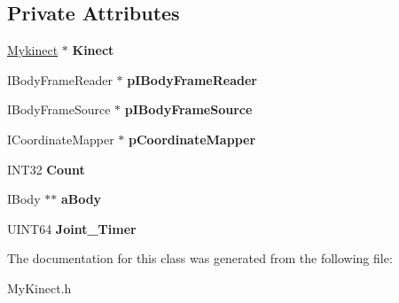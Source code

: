 \subsection*{Private Attributes}
\begin{DoxyCompactItemize}
\item 
\mbox{\label{class_kinect_1_1_my_joint_ac42457547f96340195948cba66a548e7}} 
\hyperlink{class_kinect_1_1_mykinect}{Mykinect} $\ast$ {\bfseries Kinect}
\item 
\mbox{\label{class_kinect_1_1_my_joint_a36372b93146bb4b64434cb0a545e642c}} 
I\+Body\+Frame\+Reader $\ast$ {\bfseries p\+I\+Body\+Frame\+Reader}
\item 
\mbox{\label{class_kinect_1_1_my_joint_a9759931d94f878f8b36f3aa62a4c1d2e}} 
I\+Body\+Frame\+Source $\ast$ {\bfseries p\+I\+Body\+Frame\+Source}
\item 
\mbox{\label{class_kinect_1_1_my_joint_a165f038eb7730194980c0ba420cc6279}} 
I\+Coordinate\+Mapper $\ast$ {\bfseries p\+Coordinate\+Mapper}
\item 
\mbox{\label{class_kinect_1_1_my_joint_a6a03dfaa69a5f4886e946602ecd2ed5a}} 
I\+N\+T32 {\bfseries Count}
\item 
\mbox{\label{class_kinect_1_1_my_joint_a7ee6f7cef4f90e2048b491bf0223580c}} 
I\+Body $\ast$$\ast$ {\bfseries a\+Body}
\item 
\mbox{\label{class_kinect_1_1_my_joint_afcef3afee1a90f4e1373872a08003fe1}} 
U\+I\+N\+T64 {\bfseries Joint\+\_\+\+Timer}
\end{DoxyCompactItemize}


The documentation for this class was generated from the following file\+:\begin{DoxyCompactItemize}
\item 
My\+Kinect.\+h\end{DoxyCompactItemize}
